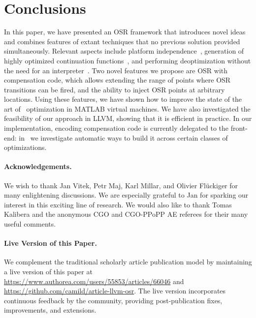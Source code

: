 
\section{Conclusions}
\label{se:conclusions}

In this paper, we have presented an OSR framework that introduces novel ideas and combines features of extant techniques that no previous solution provided simultaneously. Relevant aspects include platform independence~\cite{lameed2013modular}, generation of highly optimized continuation functions~\cite{fink2003design}, and performing deoptimization without the need for an interpreter~\cite{bebenita2010spur}. Two novel features we propose are OSR with compensation code, which allows extending the range of points where OSR transitions can be fired, and the ability to inject OSR points at arbitrary locations. Using these features, we have shown how to improve the state of the art of \feval\ optimization in MATLAB virtual machines. We have also investigated the feasibility of our approach in LLVM, showing that it is efficient in practice. In our implementation, encoding compensation code is currently delegated to the front-end: in~\cite{OSRaLaCarte} we investigate automatic ways to build it across certain classes of optimizations.

\paragraph{Acknowledgements.}

We wish to thank Jan Vitek, Petr Maj, Karl Millar, and Olivier Fl{\"u}ckiger for many enlightening discussions. We are especially grateful to Jan for sparking our interest in this exciting line of research. 
We would also like to thank Tomas Kalibera and the anonymous CGO and CGO-PPoPP AE referees for their many useful comments.

\paragraph{Live Version of this Paper.}
We complement the traditional scholarly article publication model by maintaining a live version of this paper at {\small\url{https://www.authorea.com/users/55853/articles/66046}} and {\small\url{https://github.com/camild/article-llvm-osr}}. The live version incorporates continuous feedback by the community, providing post-publication fixes, improvements, and extensions.
